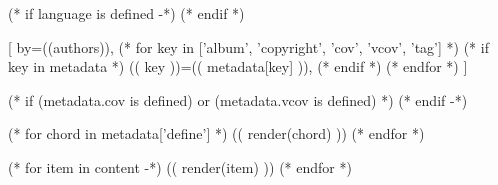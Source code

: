 

(* if language is defined -*)
(* endif *)

[
  by={((authors))},
  (* for key in ['album', 'copyright', 'cov', 'vcov', 'tag'] *)
  (* if key in metadata *)
  (( key ))={(( metadata[key] ))},
  (* endif *)
  (* endfor *)
]

(* if (metadata.cov is defined) or (metadata.vcov is defined) *)
\cover
(* endif -*)

(* for chord in metadata['define'] *)
  (( render(chord) ))
(* endfor *)

(* for item in content -*)
    (( render(item) ))
(* endfor *)

\endsong

